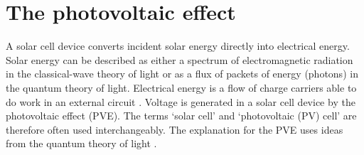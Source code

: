 \documentclass[11pt, twoside]{report}
\begin{document}



\section{The photovoltaic effect}
A solar cell device converts incident solar energy directly into electrical energy. Solar energy can be described as either a spectrum of electromagnetic radiation in the classical-wave theory of light or as a flux of packets of energy (photons) in the quantum theory of light. Electrical energy is a flow of charge carriers able to do work in an external circuit \cite{spatial_resolved_book}. Voltage is generated in a solar cell device by the photovoltaic effect (PVE). The terms `solar cell' and `photovoltaic (PV) cell' are therefore often used interchangeably. The explanation for the PVE uses ideas from the quantum theory of light \cite{Nelson1}.
\end{document}
